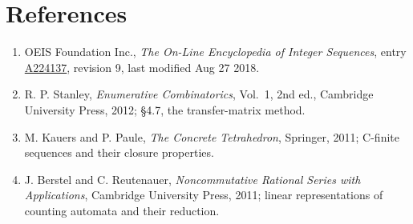 \documentclass[11pt]{article}
\theoremstyle{definition}
\begin{document}
\section{References}

\begin{enumerate}

\item OEIS Foundation Inc., \emph{The On-Line Encyclopedia of Integer Sequences}, entry \href{https://oeis.org/A224137}{A224137}, revision 9, last modified Aug 27 2018.

\item R. P. Stanley, \emph{Enumerative Combinatorics}, Vol.~1, 2nd ed., Cambridge University Press, 2012; \S4.7, the transfer-matrix method.

\item M. Kauers and P. Paule, \emph{The Concrete Tetrahedron}, Springer, 2011; C-finite sequences and their closure properties.

\item J. Berstel and C. Reutenauer, \emph{Noncommutative Rational Series with Applications}, Cambridge University Press, 2011; linear representations of counting automata and their reduction.

\end{enumerate}
\end{document}
